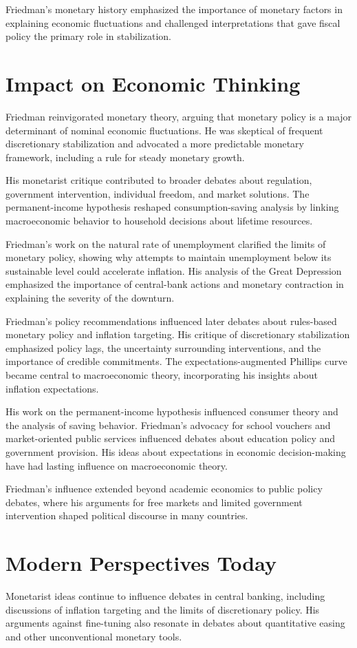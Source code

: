 Friedman's monetary history emphasized the importance of monetary factors in explaining economic
fluctuations and challenged interpretations that gave fiscal policy the primary role in
stabilization.

\section{Impact on Economic Thinking}
Friedman reinvigorated monetary theory, arguing that monetary policy is a major determinant of
nominal economic fluctuations. He was skeptical of frequent discretionary stabilization and
advocated a more predictable monetary framework, including a rule for steady monetary growth.

His monetarist critique contributed to broader debates about regulation, government intervention,
individual freedom, and market solutions. The permanent-income hypothesis reshaped
consumption-saving analysis by linking macroeconomic behavior to household decisions about lifetime
resources.

Friedman's work on the natural rate of unemployment clarified the limits of monetary policy,
showing why attempts to maintain unemployment below its sustainable level could accelerate
inflation. His analysis of the Great Depression emphasized the importance of central-bank actions
and monetary contraction in explaining the severity of the downturn.

Friedman's policy recommendations influenced later debates about rules-based monetary policy and
inflation targeting. His critique of discretionary stabilization emphasized policy lags, the
uncertainty surrounding interventions, and the importance of credible commitments. The
expectations-augmented Phillips curve became central to macroeconomic theory, incorporating his
insights about inflation expectations.

His work on the permanent-income hypothesis influenced consumer theory and the analysis of saving
behavior. Friedman's advocacy for school vouchers and market-oriented public services influenced
debates about education policy and government provision. His ideas about expectations in economic
decision-making have had lasting influence on macroeconomic theory.

Friedman's influence extended beyond academic economics to public policy debates, where his
arguments for free markets and limited government intervention shaped political discourse in
many countries.

\section{Modern Perspectives Today}
Monetarist ideas continue to influence debates in central banking, including discussions of
inflation targeting and the limits of discretionary policy. His arguments against fine-tuning also
resonate in debates about quantitative easing and other unconventional monetary tools.

